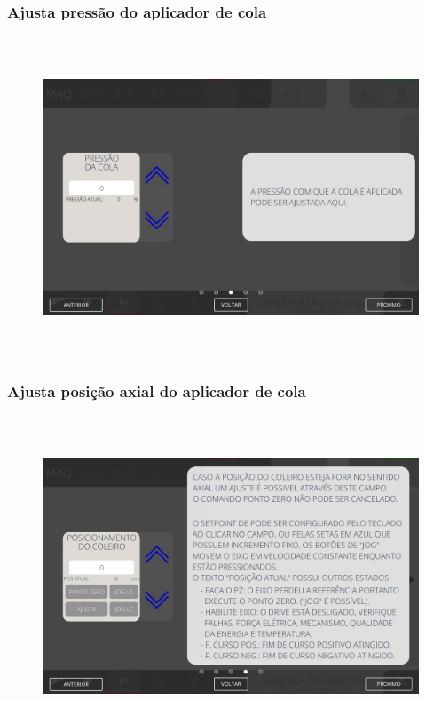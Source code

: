 \newpage
\thispagestyle{fancy}
\vspace*{40 pt}
\subsubsection{\small{Ajusta pressão do aplicador de cola}}\label{miniTelaAjustesDobraAjustaPressaoAplicadorCola}
\vspace*{\fill}
\begin{figure}[h]
  \centering
  \includegraphics[width=576px,height=360px]{src/imagesFlexo/07-fold/settings/e-3.png}
\end{figure}
\vspace*{\fill}

\newpage
\thispagestyle{fancy}
\vspace*{40 pt}
\subsubsection{\small{Ajusta posição axial do aplicador de cola}}\label{miniTelaAjustesDobraAjustaPosicaoAxialAplicadorCola}
\vspace*{\fill}
\begin{figure}[h]
  \centering
  \includegraphics[width=576px,height=360px]{src/imagesFlexo/07-fold/settings/e-4.png}
\end{figure}
\vspace*{\fill}

